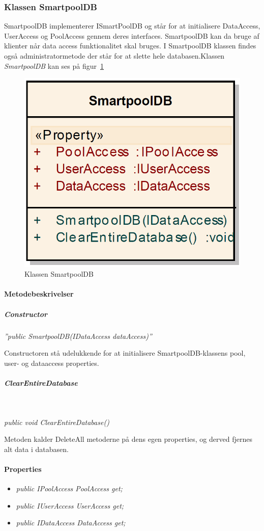 \subsubsection{Klassen SmartpoolDB}
SmartpoolDB implementerer ISmartPoolDB og står for at initialisere DataAccess, UserAccess og PoolAccess gennem deres interfaces. SmartpoolDB kan da bruge af klienter når data access funktionalitet skal bruges. I SmartpoolDB klassen findes også administratormetode der står for at slette hele databasen.Klassen \textit{SmartpoolDB} kan ses på figur~\ref{fig:smartpoolDBClass}

\begin{figure}[h]
\centering
\includegraphics[width=0.3\linewidth]{figs/implementering/smartpoolDBClass.PNG}
\caption{Klassen SmartpoolDB}
\label{fig:smartpoolDBClass}
\end{figure}

\paragraph{Metodebeskrivelser}
\subparagraph{Constructor}
\textit{''public SmartpoolDB(IDataAccess dataAccess)''}

Constructoren stå udelukkende for at initialisere SmartpoolDB-klassens pool, user- og dataaccess properties.

\subparagraph{ClearEntireDatabase}\

\textit{public void ClearEntireDatabase()}

Metoden kalder DeleteAll metoderne på dens egen properties, og derved fjernes alt data i databasen.

\paragraph{Properties}

\begin{itemize}
	\item \textit{public IPoolAccess PoolAccess { get; }}
	\item \textit{public IUserAccess UserAccess { get; }}
	\item \textit{public IDataAccess DataAccess { get; }}
\end{itemize}





